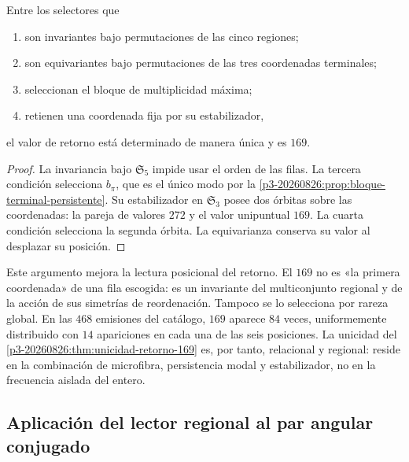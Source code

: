\begin{theorem}
\label{p3-20260826:thm:unicidad-retorno-169}
Entre los selectores que
\begin{enumerate}
  \item son invariantes bajo permutaciones de las cinco regiones;
  \item son equivariantes bajo permutaciones de las tres coordenadas
  terminales;
  \item seleccionan el bloque de multiplicidad máxima;
  \item retienen una coordenada fija por su estabilizador,
\end{enumerate}
el valor de retorno está determinado de manera única y es \(169\).
\end{theorem}

\begin{proof}
La invariancia bajo \(\mathfrak S_5\) impide usar el orden de las filas. La
tercera condición selecciona \(b_\pi\), que es el único modo por la
\cref{p3-20260826:prop:bloque-terminal-persistente}. Su estabilizador en
\(\mathfrak S_3\) posee dos órbitas sobre las coordenadas: la pareja de
valores \(272\) y el valor unipuntual \(169\). La cuarta condición selecciona la
segunda órbita. La equivarianza conserva su valor al desplazar su posición.
\end{proof}

Este argumento mejora la lectura posicional del retorno. El \(169\) no es
«la primera coordenada» de una fila escogida: es un invariante del
multiconjunto regional y de la acción de sus simetrías de reordenación.
Tampoco se lo selecciona por rareza global. En las \(468\) emisiones del
catálogo, \(169\) aparece \(84\) veces, uniformemente distribuido con
\(14\) apariciones en cada una de las seis posiciones. La unicidad del
\cref{p3-20260826:thm:unicidad-retorno-169} es, por tanto, relacional y regional: reside
en la combinación de microfibra, persistencia modal y estabilizador, no en la
frecuencia aislada del entero.

\subsection{Aplicación del lector regional al par angular conjugado}
\label{sec:s102:c38:2:6}


